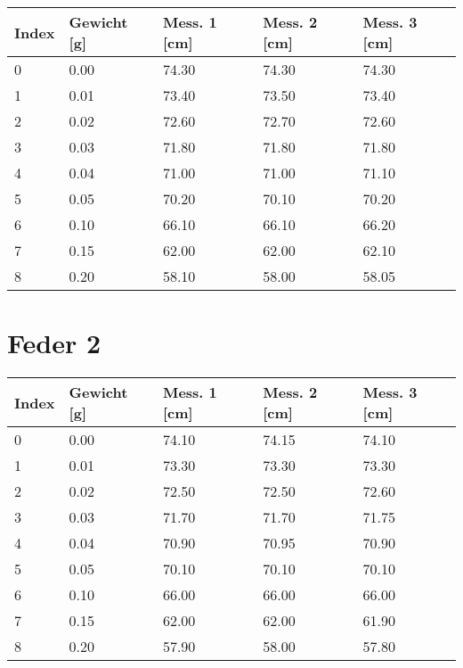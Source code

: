 \documentclass[../main.tex]{subfiles} %
\begin{document}
\begin{center}
    \begin{tabular}{ |l|l|l|l|l| } \hline\rowcolor{Gray!50}
        Index & Gewicht [g] & Mess. 1 [cm] & Mess. 2 [cm] & Mess. 3 [cm] \\\toprule\hline
        0     & 0.00        & 74.30        & 74.30        & 74.30        \\\hline
        1     & 0.01        & 73.40        & 73.50        & 73.40        \\\hline
        2     & 0.02        & 72.60        & 72.70        & 72.60        \\\hline
        3     & 0.03        & 71.80        & 71.80        & 71.80        \\\hline
        4     & 0.04        & 71.00        & 71.00        & 71.10        \\\hline
        5     & 0.05        & 70.20        & 70.10        & 70.20        \\\hline
        6     & 0.10        & 66.10        & 66.10        & 66.20        \\\hline
        7     & 0.15        & 62.00        & 62.00        & 62.10        \\\hline
        8     & 0.20        & 58.10        & 58.00        & 58.05        \\\hline
    \end{tabular}
\end{center}

\section{Feder 2}\label{sec:feder-2}

\begin{center}
    \begin{tabular}{ |l|l|l|l|l| } \hline\rowcolor{Gray!50}
        Index & Gewicht [g] & Mess. 1 [cm] & Mess. 2 [cm] & Mess. 3 [cm] \\\toprule\hline
        0     & 0.00        & 74.10        & 74.15        & 74.10        \\\hline
        1     & 0.01        & 73.30        & 73.30        & 73.30        \\\hline
        2     & 0.02        & 72.50        & 72.50        & 72.60        \\\hline
        3     & 0.03        & 71.70        & 71.70        & 71.75        \\\hline
        4     & 0.04        & 70.90        & 70.95        & 70.90        \\\hline
        5     & 0.05        & 70.10        & 70.10        & 70.10        \\\hline
        6     & 0.10        & 66.00        & 66.00        & 66.00        \\\hline
        7     & 0.15        & 62.00        & 62.00        & 61.90        \\\hline
        8     & 0.20        & 57.90        & 58.00        & 57.80        \\\hline
    \end{tabular}
\end{center}
\end{document}
